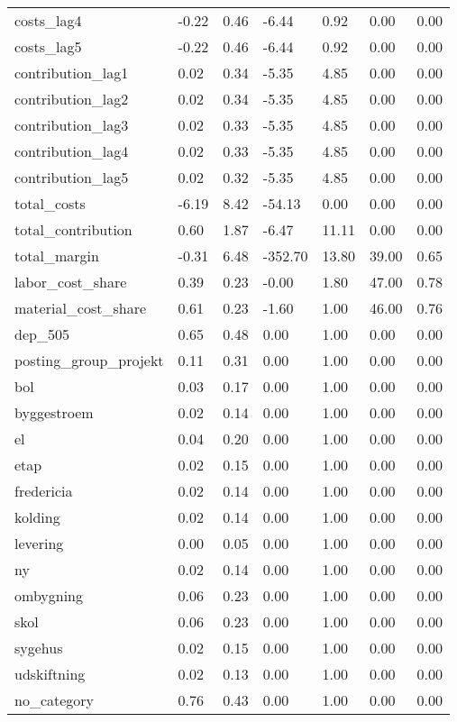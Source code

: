\begin{landscape}
\begin{longtable}[h!]{lllllll}
costs_lag4 & -0.22 & 0.46 & -6.44 & 0.92 & 0.00 & 0.00 \\
costs_lag5 & -0.22 & 0.46 & -6.44 & 0.92 & 0.00 & 0.00 \\
contribution_lag1 & 0.02 & 0.34 & -5.35 & 4.85 & 0.00 & 0.00 \\
contribution_lag2 & 0.02 & 0.34 & -5.35 & 4.85 & 0.00 & 0.00 \\
contribution_lag3 & 0.02 & 0.33 & -5.35 & 4.85 & 0.00 & 0.00 \\
contribution_lag4 & 0.02 & 0.33 & -5.35 & 4.85 & 0.00 & 0.00 \\
contribution_lag5 & 0.02 & 0.32 & -5.35 & 4.85 & 0.00 & 0.00 \\
total_costs & -6.19 & 8.42 & -54.13 & 0.00 & 0.00 & 0.00 \\
total_contribution & 0.60 & 1.87 & -6.47 & 11.11 & 0.00 & 0.00 \\
total_margin & -0.31 & 6.48 & -352.70 & 13.80 & 39.00 & 0.65 \\
labor_cost_share & 0.39 & 0.23 & -0.00 & 1.80 & 47.00 & 0.78 \\
material_cost_share & 0.61 & 0.23 & -1.60 & 1.00 & 46.00 & 0.76 \\
dep_505 & 0.65 & 0.48 & 0.00 & 1.00 & 0.00 & 0.00 \\
posting_group_projekt & 0.11 & 0.31 & 0.00 & 1.00 & 0.00 & 0.00 \\
bol & 0.03 & 0.17 & 0.00 & 1.00 & 0.00 & 0.00 \\
byggestroem & 0.02 & 0.14 & 0.00 & 1.00 & 0.00 & 0.00 \\
el & 0.04 & 0.20 & 0.00 & 1.00 & 0.00 & 0.00 \\
etap & 0.02 & 0.15 & 0.00 & 1.00 & 0.00 & 0.00 \\
fredericia & 0.02 & 0.14 & 0.00 & 1.00 & 0.00 & 0.00 \\
kolding & 0.02 & 0.14 & 0.00 & 1.00 & 0.00 & 0.00 \\
levering & 0.00 & 0.05 & 0.00 & 1.00 & 0.00 & 0.00 \\
ny & 0.02 & 0.14 & 0.00 & 1.00 & 0.00 & 0.00 \\
ombygning & 0.06 & 0.23 & 0.00 & 1.00 & 0.00 & 0.00 \\
skol & 0.06 & 0.23 & 0.00 & 1.00 & 0.00 & 0.00 \\
sygehus & 0.02 & 0.15 & 0.00 & 1.00 & 0.00 & 0.00 \\
udskiftning & 0.02 & 0.13 & 0.00 & 1.00 & 0.00 & 0.00 \\
no_category & 0.76 & 0.43 & 0.00 & 1.00 & 0.00 & 0.00 \\

\end{longtable}
\end{landscape}
